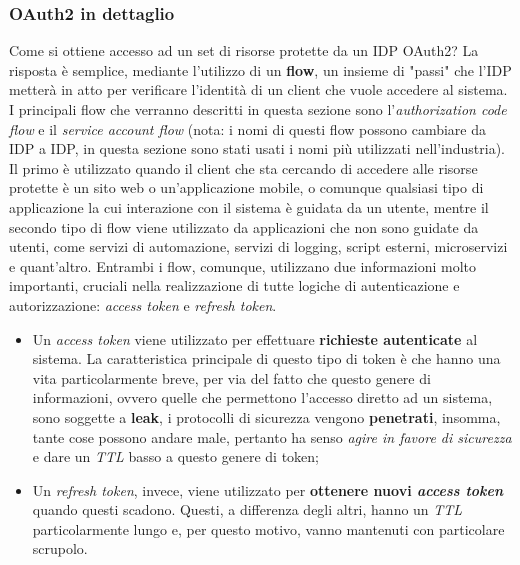 \subsubsection{OAuth2 in dettaglio}
Come si ottiene accesso ad un set di risorse protette da un IDP OAuth2? La risposta è semplice, mediante l'utilizzo di un \textbf{flow}, un insieme di "passi" che l'IDP metterà in atto per verificare l'identità di un client che vuole accedere al sistema.
\newline
I principali flow che verranno descritti in questa sezione sono l'\textit{authorization code flow} e il \textit{service account flow} (nota: i nomi di questi flow possono cambiare da IDP a IDP, in questa sezione sono stati usati i nomi più utilizzati nell'industria). 
\newline
Il primo è utilizzato quando il client che sta cercando di accedere alle risorse protette è un sito web o un'applicazione mobile, o comunque qualsiasi tipo di applicazione la cui interazione con il sistema è guidata da un utente, mentre il secondo tipo di flow viene utilizzato da applicazioni che non sono guidate da utenti, come servizi di automazione, servizi di logging, script esterni, microservizi e quant'altro.
\newline
Entrambi i flow, comunque, utilizzano due informazioni molto importanti, cruciali nella realizzazione di tutte logiche di autenticazione e autorizzazione: \textit{access token} e \textit{refresh token}.
\begin{itemize}
    \item Un \textit{access token} viene utilizzato per effettuare \textbf{richieste autenticate} al sistema. La caratteristica principale di questo tipo di token è che hanno una vita particolarmente breve, per via del fatto che questo genere di informazioni, ovvero quelle che permettono l'accesso diretto ad un sistema, sono soggette a \textbf{leak}, i protocolli di sicurezza vengono \textbf{penetrati}, insomma, tante cose possono andare male, pertanto ha senso \textit{agire in favore di sicurezza} e dare un \textit{TTL} basso a questo genere di token;
    \item Un \textit{refresh token}, invece, viene utilizzato per \textbf{ottenere nuovi \textit{access token}} quando questi scadono. Questi, a differenza degli altri, hanno un \textit{TTL} particolarmente lungo e, per questo motivo, vanno mantenuti con particolare scrupolo.
\end{itemize}
\newpage
